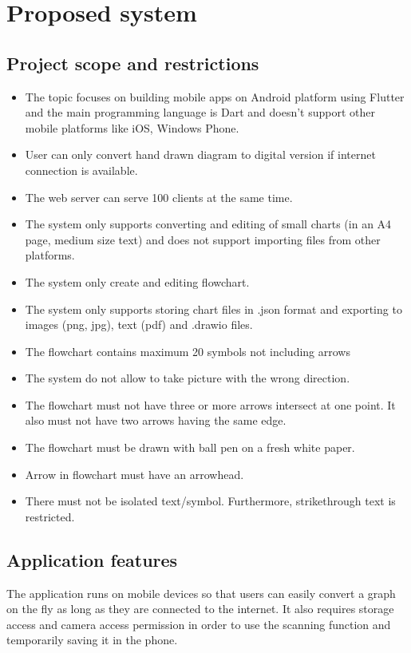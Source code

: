 \chapter{Proposed system} \label{chap:ProposedSystem}

\section{Project scope and restrictions}
\begin{itemize}
    \item The topic focuses on building mobile apps on Android platform using Flutter and the main programming language is Dart and doesn't support other mobile platforms like iOS, Windows Phone.
    \item User can only convert hand drawn diagram to digital version if internet connection is available.
    \item The web server can serve 100 clients at the same time.
    \item The system only supports converting and editing of small charts (in an A4 page, medium size text) and does not support importing files from other platforms.
    \item The system only create and editing flowchart.
    \item The system only supports storing chart files in .json format and exporting to images (png, jpg), text (pdf) and .drawio files.
    \item The flowchart contains maximum 20 symbols not including arrows
    \item The system do not allow to take picture with the wrong direction.
    \item The flowchart must not have three or more arrows intersect at one point. It also must not have two arrows having the same edge.
    \item The flowchart must be drawn with ball pen on a fresh white paper.
    \item Arrow in flowchart must have an arrowhead. 
    \item There must not be isolated text/symbol. Furthermore, strikethrough text is restricted.
\end{itemize}

\section{Application features}

The application runs on mobile devices so that users can easily convert a graph on the fly as long as they are connected to the internet. It also requires storage access and camera access permission in order to use the scanning function and temporarily saving it in the phone.

